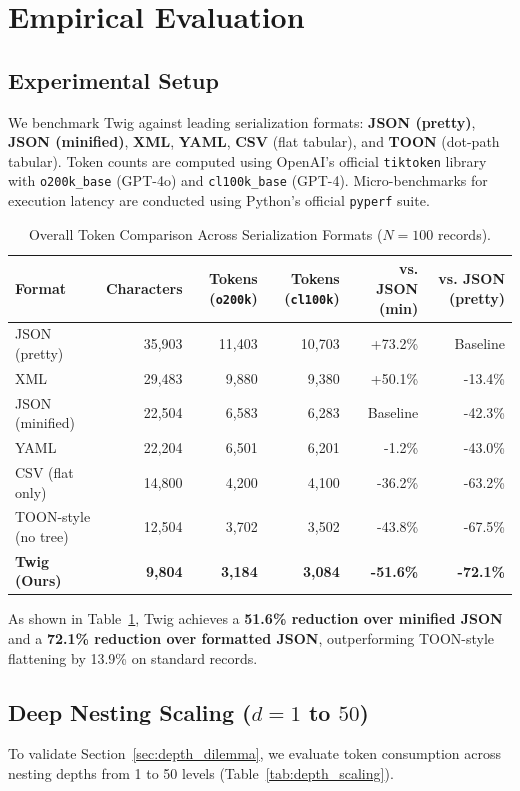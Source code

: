 \documentclass[11pt,a4paper]{article}
\begin{document}
\section{Empirical Evaluation}

\subsection{Experimental Setup}
We benchmark Twig against leading serialization formats: \textbf{JSON (pretty)}, \textbf{JSON (minified)}, \textbf{XML}, \textbf{YAML}, \textbf{CSV} (flat tabular), and \textbf{TOON} (dot-path tabular). Token counts are computed using OpenAI's official \texttt{tiktoken} library with \texttt{o200k\_base} (GPT-4o) and \texttt{cl100k\_base} (GPT-4). Micro-benchmarks for execution latency are conducted using Python's official \texttt{pyperf} suite.

\begin{table}[htbp]
\centering
\small
\caption{Overall Token Comparison Across Serialization Formats ($N=100$ records).}
\label{tab:competitor_matrix}
\begin{tabular}{lrrrrr}
\toprule
\textbf{Format} & \textbf{Characters} & \textbf{Tokens (\texttt{o200k})} & \textbf{Tokens (\texttt{cl100k})} & \textbf{vs. JSON (min)} & \textbf{vs. JSON (pretty)} \\
\midrule
JSON (pretty) & 35,903 & 11,403 & 10,703 & +73.2\% & Baseline \\
XML & 29,483 & 9,880 & 9,380 & +50.1\% & -13.4\% \\
JSON (minified) & 22,504 & 6,583 & 6,283 & Baseline & -42.3\% \\
YAML & 22,204 & 6,501 & 6,201 & -1.2\% & -43.0\% \\
CSV (flat only) & 14,800 & 4,200 & 4,100 & -36.2\% & -63.2\% \\
TOON-style (no tree) & 12,504 & 3,702 & 3,502 & -43.8\% & -67.5\% \\
\textbf{Twig (Ours)} & \textbf{9,804} & \textbf{3,184} & \textbf{3,084} & \textbf{-51.6\%} & \textbf{-72.1\%} \\
\bottomrule
\end{tabular}
\end{table}

As shown in Table~\ref{tab:competitor_matrix}, Twig achieves a \textbf{51.6\% reduction over minified JSON} and a \textbf{72.1\% reduction over formatted JSON}, outperforming TOON-style flattening by 13.9\% on standard records.

\subsection{Deep Nesting Scaling ($d=1$ to $50$)}
To validate Section~\ref{sec:depth_dilemma}, we evaluate token consumption across nesting depths from 1 to 50 levels (Table~\ref{tab:depth_scaling}).
\end{document}
